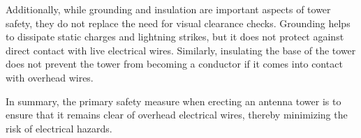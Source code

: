 Additionally, while grounding and insulation are important aspects of tower safety, they do not replace the need for visual clearance checks. Grounding helps to dissipate static charges and lightning strikes, but it does not protect against direct contact with live electrical wires. Similarly, insulating the base of the tower does not prevent the tower from becoming a conductor if it comes into contact with overhead wires.

In summary, the primary safety measure when erecting an antenna tower is to ensure that it remains clear of overhead electrical wires, thereby minimizing the risk of electrical hazards.

